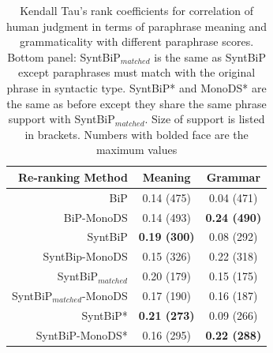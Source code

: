 \documentclass[11pt]{article}
\begin{document}
\begin{table}%
\begin{center}
\begin{tabular}{rcc}%
\hline\hline \bf \footnotesize Re-ranking Method & \bf \footnotesize Meaning & \bf \footnotesize Grammar \\ \hline
{\scriptsize BiP} & {\scriptsize 0.14 (475)} & {\scriptsize 0.04 (471)} \\
{\scriptsize BiP-MonoDS} & {\scriptsize 0.14 (493)} & {\scriptsize \bf 0.24 (490)} \\
{\scriptsize SyntBiP} & {\scriptsize \bf 0.19 (300)}& {\scriptsize 0.08 (292)} \\
{\scriptsize SyntBip-MonoDS} & {\scriptsize 0.15 (326)} & {\scriptsize 0.22 (318)} \\
\hline 
{\scriptsize SyntBiP$_{matched}$} &  {\scriptsize 0.20 (179)} & {\scriptsize 0.15 (175)} \\
{\scriptsize SyntBiP$_{matched}$-MonoDS}&  {\scriptsize 0.17 (190)} & {\scriptsize 0.16 (187)} \\
{\scriptsize SyntBiP*} &  {\scriptsize \bf 0.21 (273)} & {\scriptsize 0.09 (266)} \\
{\scriptsize SyntBiP-MonoDS*}&  {\scriptsize 0.16 (295)} & {\scriptsize \bf 0.22 (288)} \\
\hline
\end{tabular}
\end{center}
\caption{Kendall Tau's rank coefficients for correlation of human judgment in terms of paraphrase meaning and grammaticality with different paraphrase scores. Bottom panel: SyntBiP$_{matched}$ is the same as SyntBiP except paraphrases must match with the original phrase in syntactic type. SyntBiP* and MonoDS* are the same as before except they share the same phrase support with SyntBiP$_{matched}$. Size of support is listed in brackets. Numbers with bolded face are the maximum values}
\label{tbl:table4} 
\end{table}
\end{document}
